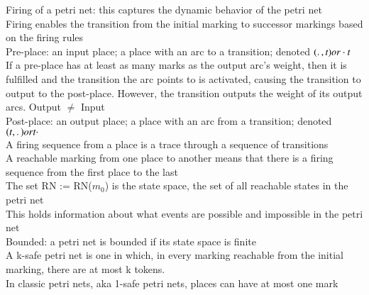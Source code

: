 Firing of a petri net: this captures the dynamic behavior of the petri net\\
Firing enables the transition from the initial marking to successor markings based on the firing rules\\
Pre-place: an input place; a place with an arc to a transition; denoted $(\ldotp , t) or  \cdot t$\\
If a pre-place has at least as many marks as the output arc's weight, then it is fulfilled and the transition the arc points to is activated, causing the transition to output to the post-place. However, the transition outputs the weight of its output arcs. Output $\ne$ Input\\
Post-place: an output place; a place with an arc from a transition; denoted $(t, \ldotp ) or t \cdot $ \\
A firing sequence from a place is a trace through a sequence of transitions\\
A reachable marking from one place to another means that there is a firing sequence from the first place to the last\\
The set RN := RN($m_0$) is the state space, the set of all reachable states in the petri net\\
This holds information about what events are possible and impossible in the petri net\\
Bounded: a petri net is bounded if its state space is finite \smallskip\\

A k-safe petri net is one in which, in every marking reachable from the initial marking, there are at most k tokens.\\
In classic petri nets, aka 1-safe petri nets, places can have at most one mark\\
 

